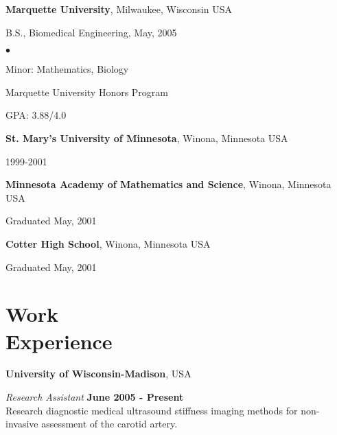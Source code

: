 \documentclass[margin,line]{res}
\newenvironment{list1}{
  \begin{list}{\ding{113}}{%
      \setlength{\itemsep}{0in}
      \setlength{\parsep}{0in} \setlength{\parskip}{0in}
      \setlength{\topsep}{0in} \setlength{\partopsep}{0in} 
      \setlength{\leftmargin}{0.17in}}}{\end{list}}
\newenvironment{list2}{
  \begin{list}{$\bullet$}{%
      \setlength{\itemsep}{0in}
      \setlength{\parsep}{0in} \setlength{\parskip}{0in}
      \setlength{\topsep}{0in} \setlength{\partopsep}{0in} 
      \setlength{\leftmargin}{0.2in}}}{\end{list}}
\begin{document}
\begin{resume}
{\bf Marquette University}, Milwaukee, Wisconsin USA\\
\vspace*{-.1in}
\begin{list1}
\item[] B.S., Biomedical Engineering,  May, 2005

\begin{list2}
 \vspace*{.05in}
 \item Minor: Mathematics, Biology
 \item Marquette University Honors Program
 \item GPA: 3.88/4.0
\end{list2}
\end{list1}

{\bf St. Mary's University of Minnesota}, Winona, Minnesota USA\\
\vspace*{-.1in}
\begin{list1}
\item[] 1999-2001
\end{list1}


{\bf Minnesota Academy of Mathematics and Science}, Winona, Minnesota USA\\
\vspace*{-.1in}
\begin{list1}
\item[] Graduated May, 2001
\end{list1}

{\bf Cotter High School}, Winona, Minnesota USA\\
\vspace*{-.1in}
\begin{list1}
\item[] Graduated May, 2001
\end{list1}

\section{\sc Work\\ Experience}

{\bf University of Wisconsin-Madison}, USA

\vspace{-.3cm}
{\em Research Assistant} \hfill {\bf June 2005 - Present} \\
Research diagnostic medical ultrasound stiffness imaging methods for non-invasive assessment of the carotid artery.


\end{resume}
\end{document}
